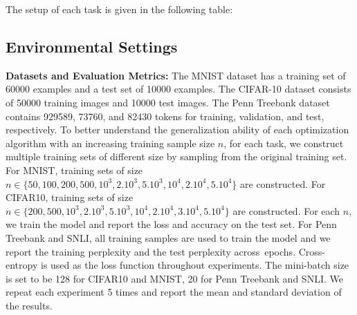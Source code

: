 \documentclass[11pt]{article}
\begin{document}
The setup of each task is given in the following table:
 \begin{table}[H]
 	\centering
 	\label{tab::network_setup}
 \end{table}


\subsection{Environmental Settings}


\textbf{Datasets and Evaluation Metrics:}  The MNIST dataset has a training set of 60000 examples and a test set of 10000 examples. The CIFAR-10 dataset consists of 50000 
training images and 10000 test images. The Penn Treebank dataset contains 929589, 73760, and 82430 tokens for training, validation, and test,  respectively.
To better understand the generalization ability of each optimization algorithm with an increasing training sample size $n$, for each task, we construct multiple training sets of different size by sampling from the original training set. For MNIST, training sets of size $n \in \{50, 100, 200, 500, 10^3, 2.10^3, 5.10^3, 10^4, 2.10^4, 5.10^4 \}$ are constructed. For CIFAR10, training sets of size $n \in \{ 200, 500, 10^3, 2.10^3, 5.10^3, 10^4, 2.10^4,3.10^4, 5.10^4\}$ are constructed. 
For each $n$, we train the model and report the loss and accuracy on the test set.  
For Penn Treebank and SNLI, all training samples are used to train the model and we report the training perplexity and the test perplexity across~epochs. 
Cross-entropy is used as the loss function throughout experiments. The mini-batch size is set to be 128 for CIFAR10 and MNIST, 20 for Penn Treebank and SNLI. 
We repeat each experiment 5 times and report the mean and standard deviation of the results.
\end{document}
